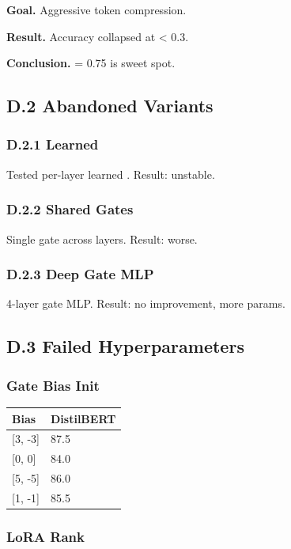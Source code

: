 \textbf{Goal.} Aggressive token compression.

\textbf{Result.} Accuracy collapsed at   \textless{} 0.3.

\textbf{Conclusion.}   = 0.75 is sweet spot.

\subsection{D.2 Abandoned Variants}

\subsubsection{D.2.1 Learned}

Tested per-layer learned  . Result: unstable.

\subsubsection{D.2.2 Shared Gates}

Single gate across layers. Result: worse.

\subsubsection{D.2.3 Deep Gate MLP}

4-layer gate MLP. Result: no improvement, more params.

\subsection{D.3 Failed Hyperparameters}

\subsubsection{Gate Bias Init}

\begin{table}[H]
\centering
\small
\begin{tabular}{ll}
\toprule
\textbf{Bias} & \textbf{DistilBERT} \\
\midrule
{[3, -3]} & 87.5 \\
{[0, 0]} & 84.0 \\
{[5, -5]} & 86.0 \\
{[1, -1]} & 85.5 \\
\bottomrule
\end{tabular}
\end{table}

\subsubsection{LoRA Rank}

